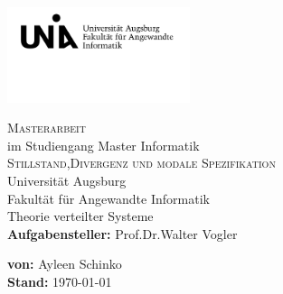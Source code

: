 \begin{titlepage}
\includegraphics[width=0.4\textwidth]{Uni_Aug_Logo_FAI_schwarz.png}
\vspace{-1cm}
\begin{center}
  \LARGE \textsc{Masterarbeit}\\
  \normalsize im Studiengang Master Informatik\\
  \vfill
  \Huge \textsc{Stillstand,Divergenz und modale Spezifikation}\\
  \vfill
  \Large Universität Augsburg\\
  Fakultät für Angewandte Informatik\\
  Theorie verteilter Systeme\\
  \vspace{2cm}
  \rmfamily \large \textbf{Aufgabensteller:} Prof.\;Dr.\;Walter Vogler
\end{center}
\vspace{1.5cm}
\large \textbf{%
  von:}
Ayleen Schinko\\
\textbf{%
  Stand:}
\today\\
\end{titlepage}
